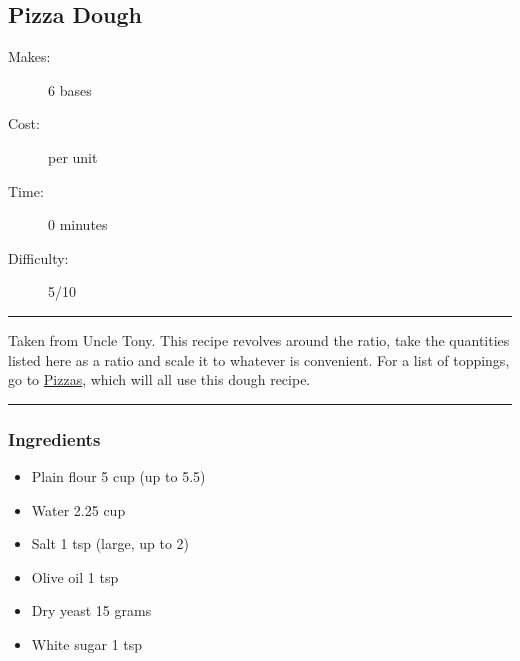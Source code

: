 \documentclass[]{article}
\begin{document}
\subsection*{\center\huge Pizza Dough}
\begin{description}
\item[Makes:] 6 bases
\item[Cost:]  per unit
\item[Time:] 0 minutes
\item[Difficulty:] 5/10
\end{description}
\vspace{0.2cm}\hrule\vspace{0.5cm}
\begin{adjustwidth}{0.5 cm}{0.5 cm}

Taken from Uncle Tony. This recipe revolves around the ratio, take the quantities listed here as a ratio and scale it to whatever is convenient. For a list of toppings, go to \hyperref[cat:Pizzas]{Pizzas}, which will all use this dough recipe. \hfill\color{accent}{\Large\faVimeoSquare\hspace{0.1cm}\faTruck\hspace{0.1cm}}\color{black}

\end{adjustwidth}
\vspace{0.5cm}\hrule
\subsubsection*{\Large Ingredients}
\begin{multicols}{2}
\begin{itemize}
 \item Plain flour \hfill 5 cup (up to 5.5)
 \item Water \hfill 2.25 cup
 \item Salt \hfill 1 tsp (large, up to 2)
 \item Olive oil \hfill 1 tsp
 \item Dry yeast \hfill 15 grams
 \item White sugar \hfill 1 tsp
\end{itemize}
\end{multicols}
\end{document}
